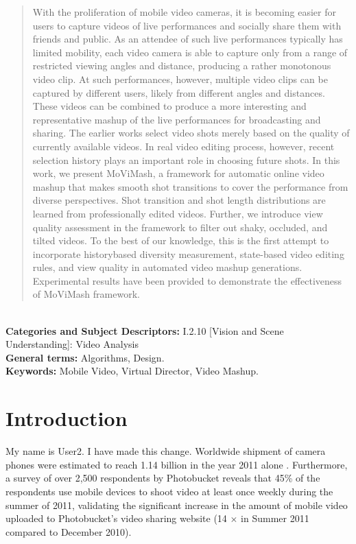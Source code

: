 \documentclass{sig-alternate}
\begin{document}
\maketitle
\begin{abstract}
With the proliferation of mobile video cameras, it is becoming easier
for users to capture videos of live performances and socially
share them with friends and public. As an attendee of such live
performances typically has limited mobility, each video camera is
able to capture only from a range of restricted viewing angles and
distance, producing a rather monotonous video clip. At such performances,
however, multiple video clips can be captured by different
users, likely from different angles and distances. These videos
can be combined to produce a more interesting and representative
mashup of the live performances for broadcasting and sharing. The
earlier works select video shots merely based on the quality of currently
available videos. In real video editing process, however, recent
selection history plays an important role in choosing future
shots. In this work, we present MoViMash, a framework for automatic
online video mashup that makes smooth shot transitions to
cover the performance from diverse perspectives. Shot transition
and shot length distributions are learned from professionally edited
videos. Further, we introduce view quality assessment in the framework
to filter out shaky, occluded, and tilted videos. To the best
of our knowledge, this is the first attempt to incorporate historybased
diversity measurement, state-based video editing rules, and
view quality in automated video mashup generations. Experimental
results have been provided to demonstrate the effectiveness of
MoViMash framework.
\end{abstract}\\
\textbf{Categories and Subject Descriptors:} I.2.10 [Vision and Scene Understanding]: Video Analysis\\
\textbf{General terms:} Algorithms, Design.\\
\textbf{Keywords:} Mobile Video, Virtual Director, Video Mashup.


\section{Introduction}\label{intro}
My name is User2. I have made this change.
Worldwide shipment of camera phones were estimated to reach
1.14 billion in the year 2011 alone \cite{1}. Furthermore, a survey of over 2,500 respondents by Photobucket reveals that 45\% of the respondents use mobile devices to shoot video at least once weekly during the summer of 2011, validating the significant increase in
the amount of mobile video uploaded to Photobucket's video sharing
website (14 $\times$ in Summer 2011 compared to December 2010)\cite{2}.
\end{document}
